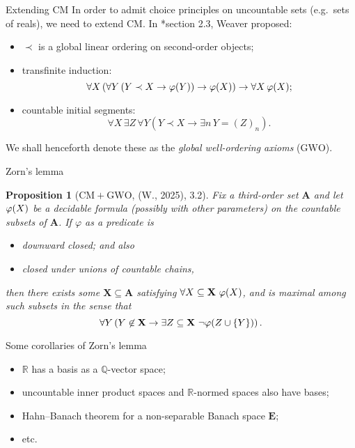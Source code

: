 \documentclass{beamer}
\newtheorem{proposition}{Proposition}
\theoremstyle{definition}
\newcommand{\CM}{\mathrm{CM}}
\newcommand{\GWO}{\mathrm{GWO}}
\begin{document}
\begin{frame}{Extending $\CM$}
  In order to admit choice principles on uncountable sets (e.g.\ sets of reals), we need to extend $\CM$. In \cite{weaver09-cm}*{section 2.3}, Weaver proposed:

  \begin{itemize}
    \item $\prec$ is a global linear ordering on second-order objects;
    \item transfinite induction:
          \[\forall X \left(\forall Y \left(Y \prec X \rightarrow \varphi\mleft(Y\mright)\right) \rightarrow \varphi\mleft(X\mright)\right) \rightarrow \forall X \, \varphi\mleft(X\mright);\]
    \item countable initial segments:
          \[\forall X \, \exists Z \, \forall Y \left(Y \prec X \rightarrow \exists n \, Y = \left(Z\right)_n\right).\]
  \end{itemize}

  We shall henceforth denote these as the \emph{global well-ordering axioms} ($\GWO$).
\end{frame}

\begin{frame}{Zorn's lemma}
  \nocite{wang-sw25-cm}
  \begin{proposition}[$\CM + \GWO$, (W., 2025), 3.2]
    Fix a third-order set $\mathbf{A}$ and let $\varphi\mleft(X\mright)$ be a decidable formula (possibly with other parameters) on the countable subsets of $\mathbf{A}$. If $\varphi$ as a predicate is
    \begin{itemize}
      \item downward closed; and also
      \item closed under unions of countable chains,
    \end{itemize}
    then there exists some $\mathbf{X} \subseteq \mathbf{A}$ satisfying $\forall X \subseteq \mathbf{X} \ \varphi\mleft(X\mright)$, and is maximal among such subsets in the sense that
    \[\forall Y \left(Y \not\in \mathbf{X} \rightarrow \exists Z \subseteq \mathbf{X} \ \neg \varphi\mleft(Z \cup \left\{Y\right\}\mright)\right).\]
  \end{proposition}
\end{frame}

\begin{frame}{Some corollaries of Zorn's lemma}
  \begin{itemize}
    \item $\mathbb{R}$ has a basis as a $\mathbb{Q}$-vector space;
    \item uncountable inner product spaces and $\mathbb{R}$-normed spaces also have bases;
    \item Hahn--Banach theorem for a non-separable Banach space $\mathbf{E}$;
    \item etc.
  \end{itemize}
\end{frame}
\end{document}
